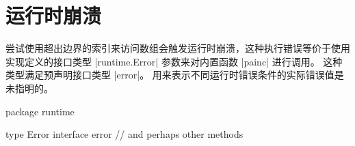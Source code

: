 \chapter{运行时崩溃}
尝试使用超出边界的索引来访问数组会触发运行时崩溃，这种执行错误等价于使用实现定义的接口类型 \code|runtime.Error| 参数来对内置函数 \code|painc| 进行调用。
这种类型满足预声明接口类型 \code|error|。
用来表示不同运行时错误条件的实际错误值是未指明的。
\begin{golang}
package runtime

type Error interface {
	error
	// and perhaps other methods
}
\end{golang}